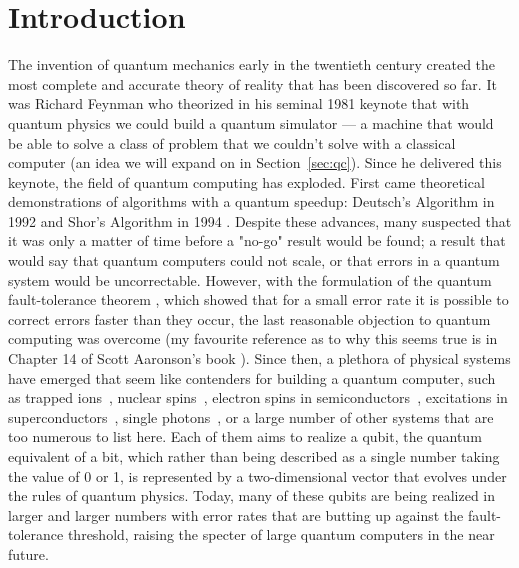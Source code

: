 \chapter{Introduction}

The invention of quantum mechanics early in the twentieth century created the most complete and accurate
theory of reality that has been discovered so far. It was Richard Feynman who theorized in his
seminal 1981 keynote \cite{Feynman1982} that with quantum physics we could build a quantum simulator ---
a machine that would be able to solve a class of problem that we couldn't solve with a
classical computer (an idea we will expand on in Section~\ref{sec:qc}). Since he delivered this keynote, the
field of quantum computing has exploded. First came theoretical demonstrations of algorithms
with a quantum speedup: Deutsch's Algorithm in 1992 \cite{Deutsch} and Shor's Algorithm in 1994 \cite{Shor}.
Despite these advances, many suspected that it was only a matter of time before a "no-go" result would
be found; a result that would say that quantum computers could not scale, or that errors in a quantum system would be uncorrectable.
However, with the formulation of the quantum fault-tolerance theorem \cite{1996quant.ph.11025A,doi:10.1098/rspa.1998.0167}, which
showed that for a small error rate it is possible to correct errors faster than they occur, the last
reasonable objection to quantum computing was overcome (my favourite reference as to why this seems true
is in Chapter 14 of Scott Aaronson's book \cite{Aaronson:skepticism}). Since then, a plethora of physical
systems have emerged that seem like contenders for building a quantum computer, such as trapped
ions~\cite{doi:10.1063/1.5088164}, nuclear spins~\cite{acs.nanolett.8b00006}, electron spins in
semiconductors~\cite{RevModPhys.79.1217}, excitations in superconductors~\cite{Wendin_2017},
single photons~\cite{OBrien1567}, or a large number of other systems that are too numerous to list here.
Each of them aims to realize a qubit, the quantum equivalent of a bit, which rather than being described
as a single number taking the value of 0 or 1, is represented by a two-dimensional vector that evolves under the rules
of quantum physics. Today, many of these qubits are being realized in larger and larger numbers with error rates
that are butting up against the fault-tolerance threshold, raising the specter of large quantum computers
in the near future.

